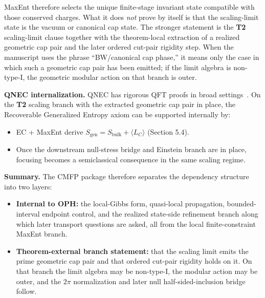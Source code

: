 MaxEnt therefore selects the unique finite-stage invariant state compatible with those conserved charges. What it does \emph{not} prove by itself is that the scaling-limit state is the vacuum or canonical cap state. The stronger statement is the \textbf{T2} scaling-limit clause together with the theorem-local extraction of a realized geometric cap pair and the later ordered cut-pair rigidity step. When the manuscript uses the phrase ``BW/canonical cap phase,'' it means only the case in which such a geometric cap pair has been emitted; if the limit algebra is non-type-I, the geometric modular action on that branch is outer.

\textbf{QNEC internalization.} QNEC has rigorous QFT proofs in broad settings~\cite{bousso16}. On the \textbf{T2} scaling branch with the extracted geometric cap pair in place, the Recoverable Generalized Entropy axiom can be supported internally by:
\begin{itemize}
\item
EC + MaxEnt derive \(S_{\mathrm{gen}}=S_{\mathrm{bulk}}+\langle L_C\rangle\) (Section 5.4).
\item
Once the downstream null-stress bridge and Einstein branch are in place, focusing becomes a semiclassical consequence in the same scaling regime.
\end{itemize}

\textbf{Summary.} The CMFP package therefore separates the dependency structure into two layers:
\begin{itemize}
\item
\textbf{Internal to OPH:} the local-Gibbs form, quasi-local propagation, bounded-interval endpoint control, and the realized state-side refinement branch along which later transport questions are asked, all from the local finite-constraint MaxEnt branch.
\item
\textbf{Theorem-external branch statement:} that the scaling limit emits the prime geometric cap pair and that ordered cut-pair rigidity holds on it. On that branch the limit algebra may be non-type-I, the modular action may be outer, and the \(2\pi\) normalization and later null half-sided-inclusion bridge follow.
\end{itemize}

